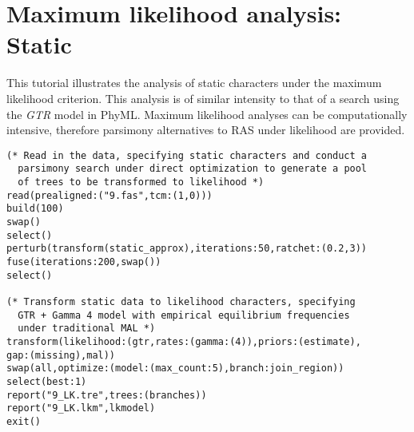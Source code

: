 \section{Maximum likelihood analysis: Static}{\label{tutorial 9}}
This tutorial illustrates the analysis of static characters under the maximum likelihood criterion.  This analysis is of similar 
intensity to that of a search using the \emph{GTR} model in PhyML.  Maximum likelihood analyses can be 
computationally intensive, therefore parsimony alternatives to RAS under likelihood are provided.  

\begin{verbatim}
(* Read in the data, specifying static characters and conduct a 
  parsimony search under direct optimization to generate a pool 
  of trees to be transformed to likelihood *)
read(prealigned:("9.fas",tcm:(1,0)))
build(100)
swap()
select()
perturb(transform(static_approx),iterations:50,ratchet:(0.2,3))
fuse(iterations:200,swap())
select()

(* Transform static data to likelihood characters, specifying 
  GTR + Gamma 4 model with empirical equilibrium frequencies   
  under traditional MAL *)
transform(likelihood:(gtr,rates:(gamma:(4)),priors:(estimate),
gap:(missing),mal))
swap(all,optimize:(model:(max_count:5),branch:join_region))
select(best:1)
report("9_LK.tre",trees:(branches))
report("9_LK.lkm",lkmodel)
exit()
\end{verbatim}

